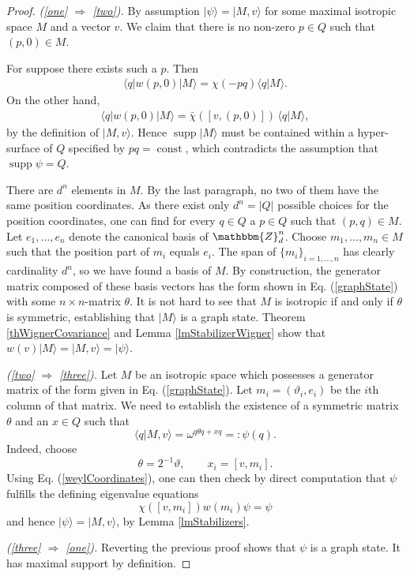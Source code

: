 \documentclass[aps,twocolumn,floatfix]{revtex4}
\def\ket#1.{|#1\rangle}
\def\bra#1.{\langle#1|}
\def\braket#1,#2.{\langle#1|#2\rangle}
\def\ZZ{\mathbbm{Z}}
\DeclareMathOperator{\supp}{supp}
\DeclareMathOperator{\const}{const}
\begin{document}
\begin{proof}
	\emph{(\ref{one} $\Rightarrow$ \ref{two}).}
	By assumption $\ket\psi.=\ket M, v.$ for some maximal isotropic
	space $M$ and a vector $v$. We claim that there is no non-zero $p\in
	Q$ such that $(p,0)\in M$.

	For suppose there exists such a $p$. Then
	\begin{eqnarray*}
		\bra q. w(p,0)\ket M.=\chi(-pq)\braket q, M..
	\end{eqnarray*}
	On the other hand,
	\begin{eqnarray*}
		\bra q. w(p,0)\ket M.=\bar\chi([v,(p,0)])\,\braket q, M.,
	\end{eqnarray*}
	by the definition of $\ket M, v.$. Hence $\supp \ket M.$ must be
	contained within a hyper-surface of $Q$ specified by $pq=\const$,
	which contradicts the assumption that $\supp\psi=Q$.

	There are $d^n$ elements in $M$. By the last paragraph, no two of
	them have the same position coordinates. As there exist only
	$d^n=|Q|$ possible choices for the position coordinates, one can
	find for every $q\in Q$ a $p\in Q$ such that $(p,q)\in M$. Let
	$e_1,\dots,e_n$ denote the canonical basis of $\ZZ_d^n$. Choose
	$m_1,\dots,m_n\in M$ such that the position part of $m_i$ equals
	$e_i$. The span of $\{m_i\}_{i=1,\dots,n}$ has clearly cardinality
	$d^n$, so we have found a basis of $M$. By construction, the
	generator matrix composed of these basis vectors has the form shown
	in Eq. (\ref{graphState}) with some $n\times n$-matrix $\theta$. It
	is not hard to see that $M$ is isotropic if and only if $\theta$ is
	symmetric, establishing that $\ket M.$ is a graph state. Theorem
	\ref{thWignerCovariance}  and Lemma \ref{lmStabilizerWigner} show
	that $w(v)\ket M.=\ket M,v.=\ket\psi.$.

	\emph{(\ref{two} $\Rightarrow$ \ref{three}).}
	Let $M$ be an isotropic space which possesses a generator matrix of
	the form given in Eq. (\ref{graphState}). Let
	$m_i=(\vartheta_i,e_i)$ be the $i$th column of that matrix.
	We need to establish the existence of a symmetric matrix $\theta$
	and an $x\in Q$ such that 
	\begin{equation*}
		\braket q, M, v. = \omega^{q\theta q+x q} =: \psi(q).
	\end{equation*}
	Indeed, choose
	\begin{equation*}
		\theta = 2^{-1} \vartheta, \quad\quad x_i = [v,m_i].
	\end{equation*}
	Using Eq. (\ref{weylCoordinates}), one can then check by direct
	computation that $\psi$ fulfills the defining eigenvalue
	equations
	\begin{equation*}
		\chi([v,m_i]) w(m_i) \psi = \psi
	\end{equation*}
	and hence $\ket\psi.=\ket M,v.$, by Lemma \ref{lmStabilizers}.

	\emph{(\ref{three} $\Rightarrow$ \ref{one}).}
	Reverting the previous proof shows that $\psi$ is a graph state.  It
	has maximal support by definition.
\end{proof}
\end{document}

